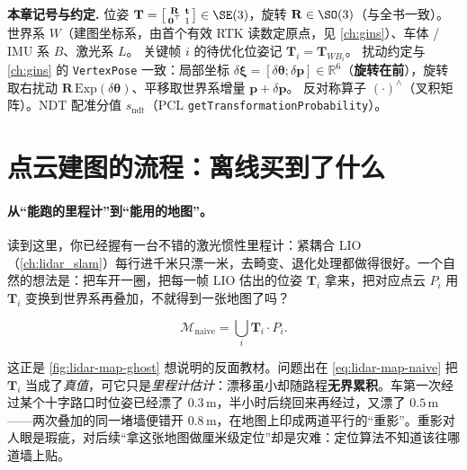 \begin{note}
\textbf{本章记号与约定.}\;
位姿 $\mathbf{T}=\big[\begin{smallmatrix}\mathbf{R}&\mathbf{t}\\\mathbf{0}^\top&1\end{smallmatrix}\big]\in\SE(3)$，旋转 $\mathbf{R}\in\SO(3)$（与全书一致）。
世界系 $W$（建图坐标系，由首个有效 RTK 读数定原点，见 \cref{ch:gins}）、车体 / IMU 系 $B$、激光系 $L$。
关键帧 $i$ 的待优化位姿记 $\mathbf{T}_i=\mathbf{T}_{WB_i}$。
扰动约定与 \cref{ch:gins} 的 \texttt{VertexPose} 一致：局部坐标 $\delta\boldsymbol{\xi}=[\delta\boldsymbol{\theta};\delta\mathbf{p}]\in\mathbb{R}^6$（\textbf{旋转在前}），旋转取右扰动 $\mathbf{R}\,\mathrm{Exp}(\delta\boldsymbol{\theta})$、平移取世界系增量 $\mathbf{p}+\delta\mathbf{p}$。
反对称算子 $(\cdot)^\wedge$（叉积矩阵）。NDT 配准分值 $s_{\text{ndt}}$（PCL \texttt{getTransformationProbability}）。
\end{note}

\section{点云建图的流程：离线买到了什么}
\label{sec:lidar-map-flow}

\paragraph{从“能跑的里程计”到“能用的地图”。}
读到这里，你已经握有一台不错的激光惯性里程计：紧耦合 LIO（\cref{ch:lidar_slam}）每行进千米只漂一米，去畸变、退化处理都做得很好。一个自然的想法是：把车开一圈，把每一帧 LIO 估出的位姿 $\mathbf{T}_i$ 拿来，把对应点云 $P_i$ 用 $\mathbf{T}_i$ 变换到世界系再叠加，不就得到一张地图了吗？

\begin{equation}
\label{eq:lidar-map-naive}
\mathcal{M}_{\text{naive}}=\bigcup_i \mathbf{T}_i\!\cdot\! P_i .
\end{equation}

这正是 \cref{fig:lidar-map-ghost} 想说明的反面教材。问题出在 \cref{eq:lidar-map-naive} 把 $\mathbf{T}_i$ 当成了\emph{真值}，可它只是\emph{里程计估计}：漂移虽小却随路程\textbf{无界累积}。车第一次经过某个十字路口时位姿已经漂了 $0.3$\,m，半小时后绕回来再经过，又漂了 $0.5$\,m——两次叠加的同一堵墙便错开 $0.8$\,m，在地图上印成两道平行的“重影”。重影对人眼是瑕疵，对后续“拿这张地图做厘米级定位”却是灾难：定位算法不知道该往哪道墙上贴。

